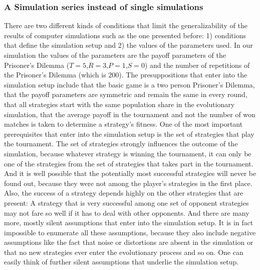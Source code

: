 \label{refinedModel} 

\subsubsection{A Simulation series instead of single simulations}

There are two different kinds of conditions that limit the generalizability of
the results of computer simulations such as the one presented before: 1)
conditions that define the simulation setup and 2) the values of the
parameters used. In our simulation the values of the parameters are the payoff
parameters of the Prisoner's Dilemma ($T=5$,$R=3$,$P=1$,$S=0$) and the number
of repetitions of the Prisoner's Dilemma (which is $200$). The presuppositions
that enter into the simulation setup include that the basic game is a two
person Prisoner's Dilemma, that the payoff parameters are symmetric and remain
the same in every round, that all strategies start with the same population
share in the evolutionary simulation, that the average payoff in the
tournament and not the number of won matches is taken to determine a strategy's
fitness. One of the most important prerequisites that enter into the simulation
setup is the set of strategies that play the tournament. The set of strategies
strongly influences the outcome of the simulation, because whatever strategy
is winning the tournament, it can only be one of the strategies from the set of
strategies that takes part in the tournament. And it is well possible that the
potentially most successful strategies will never be found out, because they
were not among the player's strategies in the first place. Also, the success of a strategy
depends highly on the other strategies that are present: A strategy that is
very successful among one set of opponent strategies may not fare so well if
it has to deal with other opponents. And there are many more, mostly silent
assumptions that enter into the simulation setup. It is in fact impossible to
enumerate all these assumptions, because they also include negative assumptions
like the fact that noise or distortions are absent in the simulation or that
no new strategies ever enter the evolutionary process and so on. One can
easily think of further silent assumptions that underlie the simulation
setup.

